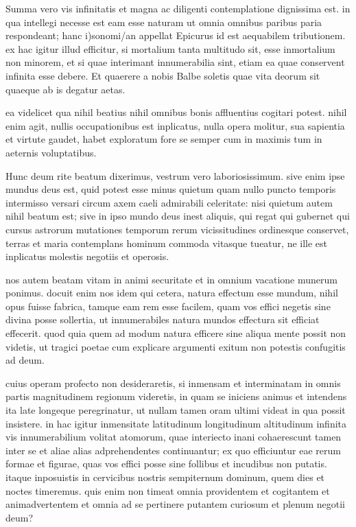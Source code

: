  Summa vero vis infinitatis et magna ac diligenti contemplatione dignissima est. in qua intellegi necesse est eam esse naturam ut omnia omnibus paribus paria respondeant; hanc i)sonomi/an appellat Epicurus id est aequabilem tributionem. ex hac igitur illud efficitur, si mortalium tanta multitudo sit, esse inmortalium non minorem, et si quae interimant innumerabilia sint, etiam ea quae conservent infinita esse debere. Et quaerere a nobis Balbe soletis quae vita deorum sit quaeque ab is degatur aetas.

 ea videlicet qua nihil beatius nihil omnibus bonis affluentius cogitari potest. nihil enim agit, nullis occupationibus est inplicatus, nulla opera molitur, sua sapientia et virtute gaudet, habet exploratum fore se semper cum in maximis tum in aeternis voluptatibus.

 Hunc deum rite beatum dixerimus, vestrum vero laboriosissimum. sive enim ipse mundus deus est, quid potest esse minus quietum quam nullo puncto temporis intermisso versari circum axem caeli admirabili celeritate: nisi quietum autem nihil beatum est; sive in ipso mundo deus inest aliquis, qui regat qui gubernet qui cursus astrorum mutationes temporum rerum vicissitudines ordinesque conservet, terras et maria contemplans hominum commoda vitasque tueatur, ne ille est inplicatus molestis negotiis et operosis.

 nos autem beatam vitam in animi securitate et in omnium vacatione munerum ponimus. docuit enim nos idem qui cetera, natura effectum esse mundum, nihil opus fuisse fabrica, tamque eam rem esse facilem, quam vos effici negetis sine divina posse sollertia, ut innumerabiles natura mundos effectura sit efficiat effecerit. quod quia quem ad modum natura efficere sine aliqua mente possit non videtis, ut tragici poetae cum explicare argumenti exitum non potestis confugitis ad deum.

 cuius operam profecto non desideraretis, si inmensam et interminatam in omnis partis magnitudinem regionum videretis, in quam se iniciens animus et intendens ita late longeque peregrinatur, ut nullam tamen oram ultimi videat in qua possit insistere. in hac igitur inmensitate latitudinum longitudinum altitudinum infinita vis innumerabilium volitat atomorum, quae interiecto inani cohaerescunt tamen inter se et aliae alias adprehendentes continuantur; ex quo efficiuntur eae rerum formae et figurae, quas vos effici posse sine follibus et incudibus non putatis. itaque inposuistis in cervicibus nostris sempiternum dominum, quem dies et noctes timeremus. quis enim non timeat omnia providentem et cogitantem et animadvertentem et omnia ad se pertinere putantem curiosum et plenum negotii deum?

